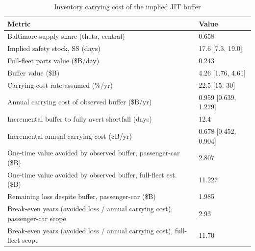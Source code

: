 \begin{table}
\caption{Inventory carrying cost of the implied JIT buffer}
\label{tab:table7_carrying_cost}
\begin{tabular}{ll}
\toprule
Metric & Value \\
\midrule
Baltimore supply share (theta, central) & 0.658 \\
Implied safety stock, SS (days) & 17.6  [7.3, 19.0] \\
Full-fleet parts value (\$B/day) & 0.243 \\
Buffer value (\$B) & 4.26  [1.76, 4.61] \\
Carrying-cost rate assumed (\%/yr) & 22.5  [15, 30] \\
Annual carrying cost of observed buffer (\$B/yr) & 0.959  [0.639, 1.279] \\
Incremental buffer to fully avert shortfall (days) & 12.4 \\
Incremental annual carrying cost (\$B/yr) & 0.678  [0.452, 0.904] \\
One-time value avoided by observed buffer, passenger-car (\$B) & 2.807 \\
One-time value avoided by observed buffer, full-fleet est. (\$B) & 11.227 \\
Remaining loss despite buffer, passenger-car (\$B) & 1.985 \\
Break-even years (avoided loss / annual carrying cost), passenger-car scope & 2.93 \\
Break-even years (avoided loss / annual carrying cost), full-fleet scope & 11.70 \\
\bottomrule
\end{tabular}
\end{table}
